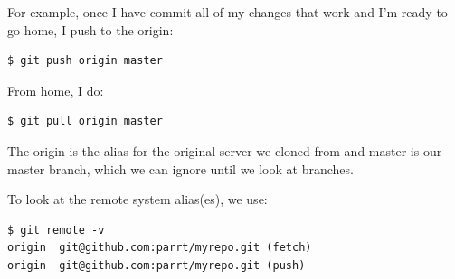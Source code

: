 \documentclass[titlepage]{tufte-book}
\begin{document}
For example, once I have commit all of my changes that work and I'm ready to go home, I push to the origin:

\begin{lstlisting}[style=BashInputStyle]
$ git push origin master
\end{lstlisting}

\noindent From home, I do:

\begin{lstlisting}[style=BashInputStyle]
$ git pull origin master
\end{lstlisting}

\noindent The origin is the alias for the original server we cloned from and master is our master branch, which we can ignore until we look at branches.

To look at the remote system alias(es), we use:

\begin{lstlisting}[style=BashInputStyle]
$ git remote -v
origin  git@github.com:parrt/myrepo.git (fetch)
origin  git@github.com:parrt/myrepo.git (push)
\end{lstlisting}
\end{document}
